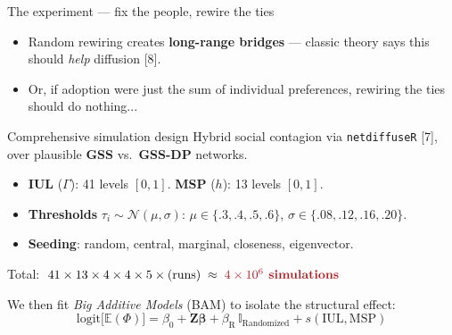 \documentclass[aspectratio=169,11pt]{beamer}
\newcommand{\refn}[1]{{\color{ndgreen}[#1]}}
\newcommand{\emphr}[1]{{\color{ndreddark}\textbf{#1}}}
\begin{document}
\begin{frame}{The experiment — fix the people, rewire the ties}
\begin{center}
\end{center}
\vspace{0.25cm}
\begin{itemize}
  \item Random rewiring creates \emphr{long-range bridges} — classic theory says
        this should \emph{help} diffusion \refn{8}.
  \vspace{0.15cm}
  \item Or, if adoption were just the sum of individual preferences,
rewiring the ties should do nothing...
\end{itemize}
\vspace{0.25cm}
\end{frame}

\begin{frame}{Comprehensive simulation design}
Hybrid social contagion via \texttt{netdiffuseR} \refn{7}, over plausible \emphr{GSS}
vs.\ \emphr{GSS-DP} networks.
\vspace{0.2cm}
\begin{itemize}
  \item \textbf{IUL} ($\Gamma$): 41 levels $[0,1]$. \quad \textbf{MSP} ($h$): 13 levels $[0,1]$.
  \item \textbf{Thresholds} $\tau_i\sim\mathcal{N}(\mu,\sigma)$: $\mu\in\{.3,.4,.5,.6\}$, $\sigma\in\{.08,.12,.16,.20\}$.
  \item \textbf{Seeding}: random, central, marginal, closeness, eigenvector.
\end{itemize}
\vspace{0.2cm}
\begin{center}
Total: $\;41\times13\times4\times4\times5\times \text{(runs)} \;\approx\; \emphr{$4\times10^{6}$ simulations}$
\end{center}
\vspace{0.2cm}
We then fit \emph{Big Additive Models} (BAM) to isolate the structural effect:
\begin{equation*}
  \mathrm{logit}\big[\mathbb{E}(\Phi)\big]=\beta_0+\mathbf{Z}\boldsymbol\beta
  +\beta_{\text{R}}\,\mathbb{I}_{\text{Randomized}}+s(\mathrm{IUL},\mathrm{MSP})
\end{equation*}
\end{frame}
\end{document}
